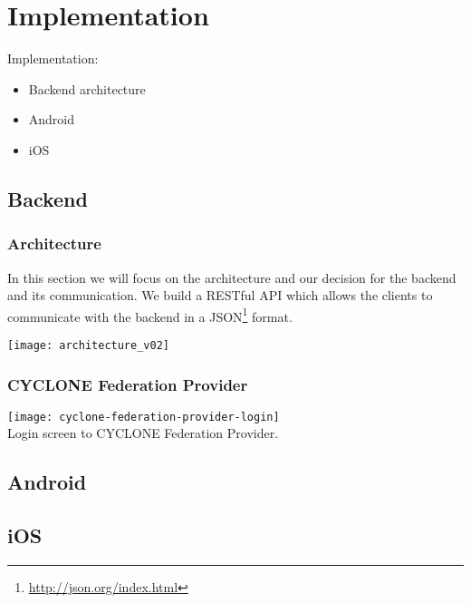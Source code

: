 \chapter{Implementation}
\label{cha:implementation}

Implementation:
\begin{itemize}
    \item Backend architecture
    \item Android
    \item iOS
\end{itemize}


\vspace{0.5cm}

\section{Backend}

\subsection{Architecture}

In this section we will focus on the architecture and our decision for the backend and its communication.
We build a RESTful API which allows the clients to communicate with the backend in a JSON\footnote{\url{http://json.org/index.html}} format. 

\begin{center}
    \texttt{[image: architecture\_v02]}\\
\end{center}

\subsection{CYCLONE Federation Provider}

\begin{center}
    \texttt{[image: cyclone-federation-provider-login]}\\
    Login screen to CYCLONE Federation Provider.
\end{center}


\vspace{0.5cm}

\section{Android}


\vspace{0.5cm}

\section{iOS}
